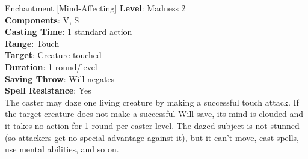 {Enchantment [Mind-Affecting]}
{
	\textbf{Level}: Madness 2\\
	\textbf{Components}: V, S\\
	\textbf{Casting Time}: 1 standard action\\
	\textbf{Range}: Touch\\
	\textbf{Target}: Creature touched\\
	\textbf{Duration}: 1 round/level\\
	\textbf{Saving Throw}: Will negates\\
	\textbf{Spell Resistance}: Yes\\
}
{
	The caster may daze one living creature by making a successful touch attack. If the target creature does not make a successful Will save, its mind is clouded and it takes no action for 1 round per caster level. The dazed subject is not stunned (so attackers get no special advantage against it), but it can't move, cast spells, use mental abilities, and so on.
}